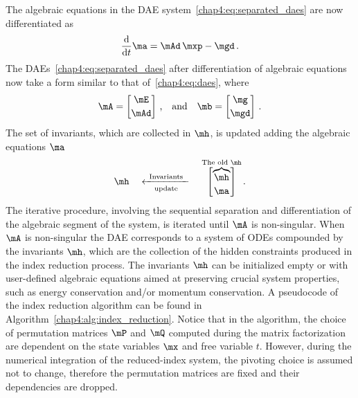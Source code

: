 The algebraic equations in the \ac{DAE} system~\eqref{chap4:eq:separated_daes} are now differentiated as
%
\begin{equation*}
  \dfrac{\mathrm{d}}{\mathrm{d}t} \ma = \mAd \, \mxp - \mgd \, \text{.}
\end{equation*}
%
The \acp{DAE}~\eqref{chap4:eq:separated_daes} after differentiation of algebraic equations now take a form similar to that of~\eqref{chap4:eq:daes}, where
%
\begin{equation*}
  \mA = \begin{bmatrix} \mE \\[0.2em] \mAd\end{bmatrix} \, \text{,}
  \quad \text{and} \quad
  \mb = \begin{bmatrix} \mg \\[0.2em] \mgd\end{bmatrix} \, \text{.}
\end{equation*}
%
The set of invariants, which are collected in $\mh$, is updated adding the algebraic equations $\ma$
%
\begin{equation*}
  \mh \quad \xleftarrow[\text{update}]{\text{\, Invariants \,}} \quad \overset{{\text{The old $\mh$}}}{\begin{bmatrix} \overbrace{\mh} \\[0.2em] \ma \end{bmatrix}} \, \text{.}
\end{equation*}
%
The iterative procedure, involving the sequential separation and differentiation of the algebraic segment of the system, is iterated until $\mA$ is non-singular. When $\mA$ is non-singular the \ac{DAE} corresponds to a system of \acp{ODE} compounded by the invariants $\mh$, which are the collection of the hidden constraints produced in the index reduction process. The invariants $\mh$ can be initialized empty or with user-defined algebraic equations aimed at preserving crucial system properties, such as energy conservation and/or momentum conservation. A pseudocode of the index reduction algorithm can be found in Algorithm~\ref{chap4:alg:index_reduction}. Notice that in the algorithm, the choice of permutation matrices $\mP$ and $\mQ$ computed during the matrix factorization are dependent on the state variables $\mx$ and free variable $t$. However, during the numerical integration of the reduced-index system, the pivoting choice is assumed not to change, therefore the permutation matrices are fixed and their dependencies are dropped.

